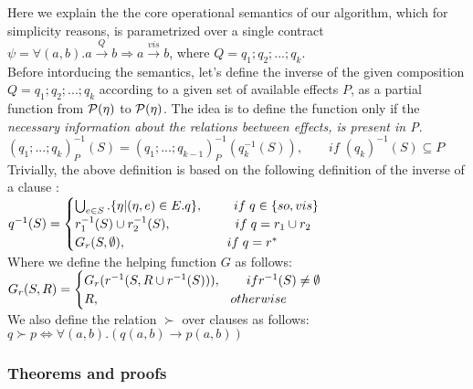 Here we explain the the core operational semantics of our algorithm, which for simplicity reasons, 
is parametrized over a single contract 
$\psi = \forall (a,b). a \xrightarrow{Q} b  \Rightarrow a
\xrightarrow{vis} b$, where $Q=q_1;q_2;...;q_k$. 
\\Before intorducing the semantics, let's define the inverse of the
given composition $Q=q_1;q_2;...;q_k$ according to a given
set of available effects $P$, as a partial function from $\mathcal{P}(\eta)$ to
$\mathcal{P}(\eta)$. The idea is to define the function only if the \emph{necessary information about the relations beetween effects, is present in P}.
\\ $
(q_1;...;q_k)^{-1}_P (S)= (q_1;...;q_{k-1})^{-1}_P (q^{-1}_{k}(S)), \qquad 
if \; (q_k)^{-1}(S) \subseteq P$
\\Trivially, the above definition is based on the following definition of
the inverse of a clause :\\
$q^{-1}(S) = 
\begin{cases}
\bigcup^{}_{e\in S}. \{\eta|(\eta,e) \in E.q \}, \hspace{8.5 mm} if \;
q\in\{so,vis\} \\ 
r_1^{-1}(S)\cup r_2^{-1}(S), \qquad \spc \qquad if \; q=r_1\cup r_2\\
G_{r}(S,\emptyset), \quad \hspace{17.25 mm} \qquad if \; q=r^* 
\end{cases}
$
\\ Where we define the helping function $G$ as follows: 
$G_r(S,R) =
\begin{cases} 
G_r(r^{-1}(S,R\cup r^{-1}(S))), \qquad if r^{-1}(S) \neq \emptyset  \\
R,                          \hspace{36.1mm} otherwise
\end{cases}$ \\
We also define the relation $\succ$ over clauses as follows: $q \succ
p \iff \forall (a,b). (q(a,b) \rightarrow p(a,b)) $

\newpage
\subsubsection{Theorems and proofs}

